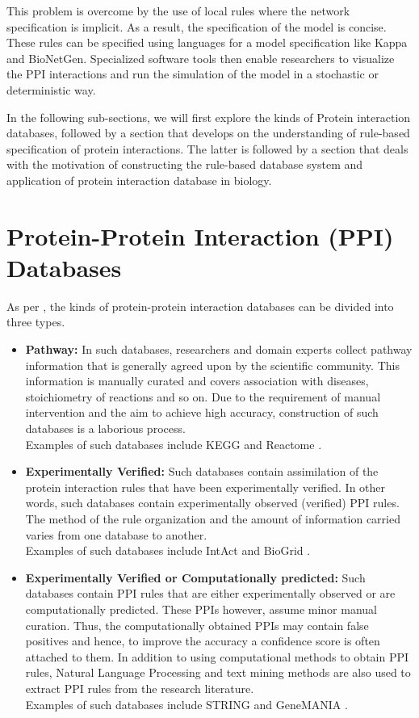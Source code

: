 \documentclass[msc,deptreport,ai]{infthesis}      %
\begin{document}
This problem is overcome by the use of local rules where the network specification is implicit. As a result, the specification of the model is concise. These rules can be specified using languages for a model specification like Kappa \cite{kappa}  and BioNetGen\cite{bioNetGen}. Specialized software tools then enable researchers to visualize the PPI interactions and run the simulation of the model in a stochastic or deterministic way.

In the following sub-sections, we will first explore the kinds of Protein interaction databases, followed by a section that develops on the understanding of rule-based specification of protein interactions. The latter is followed by a section that deals with the motivation of constructing the rule-based database system and application of protein interaction database in biology.

\section{Protein-Protein Interaction (PPI) Databases}
As per \cite{typesOfPPIdb}, the kinds of protein-protein interaction databases can be divided into three types.
\begin{itemize}
	\item
	\textbf{Pathway:} In such databases, researchers and domain experts collect pathway information that is generally agreed upon by the scientific community. This information is manually curated and covers association with diseases, stoichiometry of reactions and so on. Due to the requirement of manual intervention and the aim to achieve high accuracy, construction of such databases is a laborious process.\\ Examples of such databases include KEGG \cite{kegg} and Reactome \cite{reactome}.
	\item
	\textbf{Experimentally Verified: } Such databases contain assimilation of the protein interaction rules that have been experimentally verified. In other words, such databases contain experimentally observed (verified) PPI rules. The method of the rule organization and the amount of information carried varies from one database to another. \\Examples of such databases include IntAct \cite{intact} and BioGrid \cite{biogrid}.
	\item
	\textbf{Experimentally Verified or Computationally predicted: } Such databases contain PPI rules that are either experimentally observed or are computationally predicted. These PPIs however, assume minor manual curation. Thus, the computationally obtained PPIs may contain false positives and hence, to improve the accuracy a confidence score is often attached to them. In addition to using computational methods to obtain PPI rules, Natural Language Processing and text mining methods are also used to extract PPI rules from the research literature.\\  Examples of such databases include  STRING \cite{string} and GeneMANIA \cite{genemania}.
\end{itemize}
\end{document}
